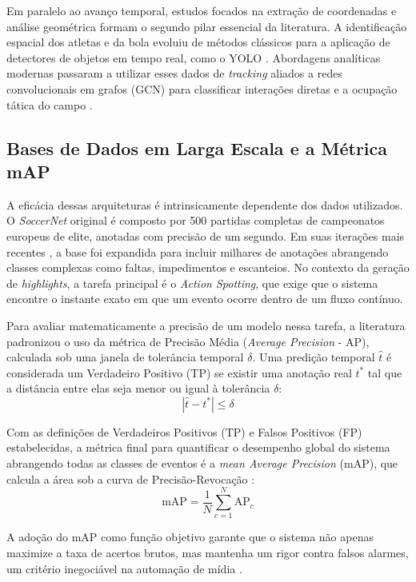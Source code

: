 \documentclass[a4paper,10pt, twocolumn]{article}
\begin{document}
Em paralelo ao avanço temporal, estudos focados na extração de coordenadas e análise geométrica formam o segundo pilar essencial da literatura. A identificação espacial dos atletas e da bola evoluiu de métodos clássicos \cite{liu2009automatic} para a aplicação de detectores de objetos em tempo real, como o YOLO \cite{redmon2016you, dedgaonkar2025real, darapaneni2022detecting}. Abordagens analíticas modernas passaram a utilizar esses dados de \textit{tracking} aliados a redes convolucionais em grafos (GCN) para classificar interações diretas e a ocupação tática do campo \cite{vidal2022automatic, majeed2025real, indahsari2025implementation}.

\subsection{Bases de Dados em Larga Escala e a Métrica mAP}

A eficácia dessas arquiteturas é intrinsicamente dependente dos dados utilizados. O \textit{SoccerNet} original é composto por 500 partidas completas de campeonatos europeus de elite, anotadas com precisão de um segundo. Em suas iterações mais recentes \cite{giancola2022soccernet, cioppa2024soccernet}, a base foi expandida para incluir milhares de anotações abrangendo classes complexas como faltas, impedimentos e escanteios. No contexto da geração de \textit{highlights}, a tarefa principal é o \textit{Action Spotting}, que exige que o sistema encontre o instante exato em que um evento ocorre dentro de um fluxo contínuo.

Para avaliar matematicamente a precisão de um modelo nessa tarefa, a literatura padronizou o uso da métrica de Precisão Média (\textit{Average Precision} - AP), calculada sob uma janela de tolerância temporal $\delta$. Uma predição temporal $\hat{t}$ é considerada um Verdadeiro Positivo (TP) se existir uma anotação real $t^{*}$ tal que a distância entre elas seja menor ou igual à tolerância $\delta$:
$$ |\hat{t} - t^{*}| \leq \delta $$

Com as definições de Verdadeiros Positivos (TP) e Falsos Positivos (FP) estabelecidas, a métrica final para quantificar o desempenho global do sistema abrangendo todas as classes de eventos é a \textit{mean Average Precision} (mAP), que calcula a área sob a curva de Precisão-Revocação \cite{giancola2022soccernet}:
$$ \mathrm{mAP} = \frac{1}{N} \sum_{c=1}^{N} \mathrm{AP}_{c} $$

A adoção do mAP como função objetivo garante que o sistema não apenas maximize a taxa de acertos brutos, mas mantenha um rigor contra falsos alarmes, um critério inegociável na automação de mídia \cite{cioppa2024soccernet}.
\end{document}

